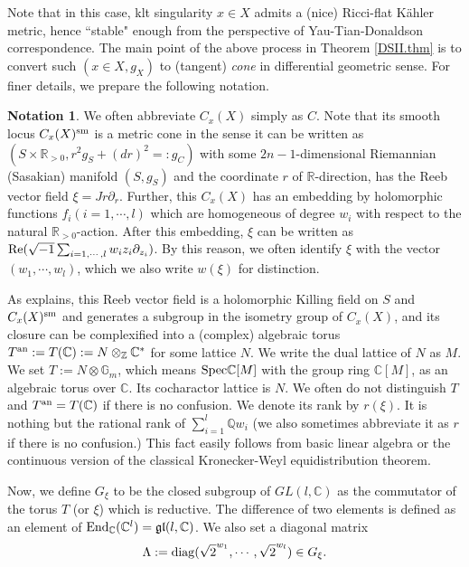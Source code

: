 \documentclass[12pt,a4paper]{amsart}
\theoremstyle{remark}
\theoremstyle{definition}
\newtheorem{ntt}{Notation}
\def\R{\mathbb{R}}
\def\C{\mathbb{C}}
\def\G{\mathbb{G}}
\def\Z{\mathbb{Z}}
\def\Q{\mathbb{Q}}
\begin{document}
Note that in this case, klt singularity 
$x\in X$ admits a (nice) Ricci-flat K\"ahler 
metric, hence ``stable" enough from the perspective of 
Yau-Tian-Donaldson correspondence. 
The main point of the above process in Theorem \ref{DSII.thm} is to 
convert such $(x\in X,g_X)$ 
to (tangent) {\it cone} in differential geometric sense. 
For finer details, we prepare the following notation. 
\begin{ntt}\label{ntt1}
We often abbreviate $C_x(X)$ simply as $C$. 
Note that its smooth locus 
$C_x(X)^{\rm sm}$ is a metric cone
in the sense it can be written as 
$(S\times \R_{>0},r^2 g_S+(dr)^2=:g_C)$ with some $2n-1$-dimensional Riemannian (Sasakian)  manifold $(S,g_S)$ and 
the coordinate $r$ of $\R$-direction, 
has the Reeb vector field $\xi=Jr\partial_r$. 
Further, this $C_x(X)$ has an embedding by holomorphic functions $f_i (i=1,\cdots,l)$ 
which are homogeneous of degree $w_i$ with respect to the natural $\R_{>0}$-action. 
After this embedding, $\xi$ can be written as 
${\rm Re}(\sqrt{-1}\sum_{i=1,\cdots,l}w_i z_i \partial_{z_i})$. 
By this reason, we often identify $\xi$ with the vector $(w_1,\cdots,w_l)$, which we also write $w(\xi)$ for distinction. 

As \cite[(around) Lemma 2.17]{DSII} explains, 
this Reeb vector field is a holomorphic Killing field on 
$S$ and $C_x(X)^{\rm sm}$ and 
generates a subgroup in the isometry group of $C_x(X)$, 
and its closure can be complexified into a (complex)  algebraic torus $T^{\rm an}:=T(\C):=N\otimes_{\Z} \C^*$ for some lattice $N$. 
We write the dual lattice of $N$ as $M$. 
We set $T:=N\otimes \G_m$, 
which means ${\rm Spec}\C[M]$ with the group ring 
$\C[M]$, 
as an algebraic torus over $\C$. 
Its cocharactor lattice is $N$. 
We often do not distinguish $T$ and $T^{\rm an}=T(\C)$ 
if there is no confusion. 
We denote its rank by $r(\xi)$. 
It is nothing but the rational rank of $\sum_{i=1}^l \Q w_i$ 
(we also sometimes abbreviate it as $r$ if there is no confusion.) 
This fact easily follows from basic linear algebra or 
the continuous version of the classical Kronecker-Weyl 
equidistribution theorem. 

Now, we define $G_\xi$ to be the closed subgroup of 
$GL(l,\C)$ as the commutator of the torus $T$ (or $\xi$) which is reductive. 
The difference of two elements 
is defined as an element of ${\rm End}_{\C}(\C^l)=\mathfrak{gl}(l,\C)$. 
We also set a diagonal matrix $$\Lambda:={\rm diag}(\sqrt{2}^{w_1},\cdots,\sqrt{2}^{w_l})\in G_\xi.$$ 
\end{ntt}
\end{document}
